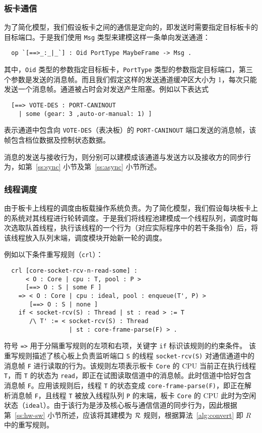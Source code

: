\subsubsection{板卡通信}

为了简化模型，我们假设板卡之间的通信是定向的，即发送时需要指定目标板卡的目标端口。于是我们使用 \verb|Msg| 类型来建模这样一条单向发送通道：
\begin{verbatim}
  op `[==>_:_|_`] : Oid PortType MaybeFrame -> Msg .
\end{verbatim}
其中，\verb|Oid| 类型的参数指定目标板卡，\verb|PortType| 类型的参数指定目标端口，第三个参数是发送的消息帧。而且我们假定这样的发送通道缓冲区大小为 1，每次只能发送一个消息帧。通道被占时会对发送产生阻塞。例如以下表达式
\begin{verbatim}
  [==> VOTE-DES : PORT-CANINOUT 
    | some (gear: 3 ,auto-or-manual: 1) ]
\end{verbatim}
表示通道中包含向 \verb|VOTE-DES|（表决板）的 \verb|PORT-CANINOUT| 端口发送的消息帧，该帧包含档位数据及控制状态数据。

消息的发送与接收行为，则分别可以建模成该通道与发送方以及接收方的同步行为，如第~\ref{ss:sync} 小节及第~\ref{ss:async} 小节所述。 

\subsubsection{线程调度}

由于板卡上线程的调度由板载操作系统负责。为了简化模型，我们假设每块板卡上的系统对其线程进行轮转调度。于是我们将线程池建模成一个线程队列，调度时每次选取队首线程，执行该线程的一个行为（对应实际程序中的若干条指令）后，将该线程放入队列末端，调度模块开始新一轮的调度。

例如以下条件重写规则（\verb|crl|）：
\begin{verbatim}
  crl [core-socket-rcv-n-read-some] :
      < O : Core | cpu : T, pool : P > 
      [==> O : S | some F ]
    => < O : Core | cpu : ideal, pool : enqueue(T', P) >
       [==> O : S | none ]
    if < socket-rcv(S) : Thread | st : read > := T
       /\ T' := < socket-rcv(S) : Thread 
                  | st : core-frame-parse(F) > . 
\end{verbatim}
符号 \verb|=>| 用于分隔重写规则的左项和右项，关键字 \verb|if| 标识该规则的约束条件。
该重写规则描述了核心板上负责监听端口 \verb|S| 的线程 \verb|socket-rcv(S)| 对通信通道中的消息帧 \verb|F| 进行读取的行为。该规则左项表示板卡 \verb|Core| 的 CPU 当前正在执行线程 \verb|T|，而 \verb|T| 的状态为 \verb|read|，即正在试图读取信道中的消息帧。此时信道中恰好包含消息帧 \verb|F|。应用该规则后，线程 \verb|T| 的状态变成 \verb|core-frame-parse(F)|，即正在解析消息帧 \verb|F|，且线程 \verb|T| 被放入线程队列 \verb|P| 的末端，板卡 \verb|Core| 的 CPU 此时为空闲状态（\verb|ideal|）。由于该行为是涉及核心板与通信信道的同步行为，因此根据第~\ref{ss:hw-sw} 小节所述，应该将其建模为 $\mathcal{R}$ 规则，根据算法~\ref{alg:convert} 即 $R$ 中的重写规则。

